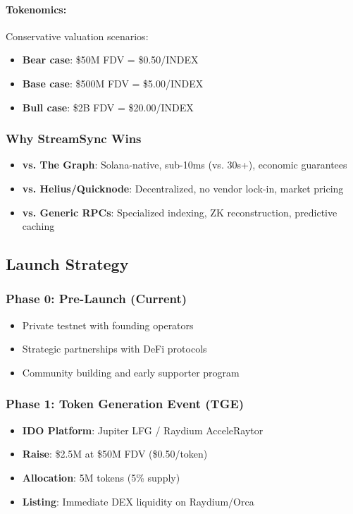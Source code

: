 \documentclass[12pt,a4paper]{article}
\begin{document}
\paragraph{Tokenomics:} Conservative valuation scenarios:
\begin{itemize}
    \item \textbf{Bear case}: \$50M FDV = \$0.50/INDEX
    \item \textbf{Base case}: \$500M FDV = \$5.00/INDEX
    \item \textbf{Bull case}: \$2B FDV = \$20.00/INDEX
\end{itemize}

\subsubsection{Why StreamSync Wins}

\begin{itemize}
    \item \textbf{vs. The Graph}: Solana-native, sub-10ms (vs. 30s+), economic guarantees
    \item \textbf{vs. Helius/Quicknode}: Decentralized, no vendor lock-in, market pricing
    \item \textbf{vs. Generic RPCs}: Specialized indexing, ZK reconstruction, predictive caching
\end{itemize}

\subsection{Launch Strategy}

\subsubsection{Phase 0: Pre-Launch (Current)}
\begin{itemize}
    \item Private testnet with founding operators
    \item Strategic partnerships with DeFi protocols
    \item Community building and early supporter program
\end{itemize}

\subsubsection{Phase 1: Token Generation Event (TGE)}
\begin{itemize}
    \item \textbf{IDO Platform}: Jupiter LFG / Raydium AcceleRaytor
    \item \textbf{Raise}: \$2.5M at \$50M FDV (\$0.50/token)
    \item \textbf{Allocation}: 5M tokens (5\% supply)
    \item \textbf{Listing}: Immediate DEX liquidity on Raydium/Orca
\end{itemize}
\end{document}
